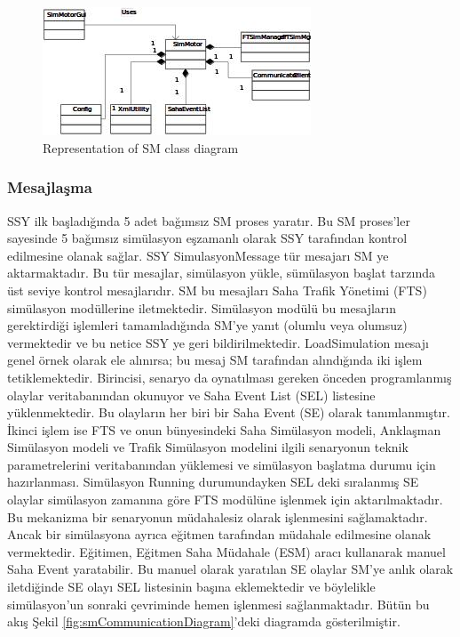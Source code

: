 \documentclass[conference]{IEEEtran}
\begin{document}
\begin{figure}[h!]
  \centering
  \includegraphics[width=8cm]{smgrafic.jpg}
  \caption{Representation of SM class diagram}\label{fig:smgrafic}
\end{figure}



\subsubsection{Mesajlaşma}
SSY ilk başladığında 5 adet bağımsız SM proses yaratır. Bu SM proses’ler sayesinde 5 bağımsız simülasyon eşzamanlı olarak SSY tarafından kontrol edilmesine olanak sağlar. SSY SimulasyonMessage tür mesajarı SM ye aktarmaktadır. Bu tür mesajlar, simülasyon yükle, sümülasyon başlat tarzında üst seviye kontrol mesajlarıdır. SM bu mesajları Saha Trafik Yönetimi (FTS) simülasyon modüllerine iletmektedir. Simülasyon modülü bu mesajların gerektirdiği işlemleri tamamladığında SM’ye yanıt (olumlu veya olumsuz) vermektedir ve bu netice SSY ye geri bildirilmektedir.
LoadSimulation mesajı genel örnek olarak ele alınırsa; bu mesaj SM tarafından alındığında iki işlem tetiklemektedir. Birincisi, senaryo da oynatılması gereken önceden programlanmış olaylar veritabanından okunuyor ve Saha Event List (SEL) listesine yüklenmektedir. Bu olayların her biri bir Saha Event (SE) olarak tanımlanmıştır. 
İkinci işlem ise FTS ve onun bünyesindeki Saha Simülasyon modeli, Anklaşman Simülasyon  modeli ve Trafik Simülasyon  modelini ilgili senaryonun teknik parametrelerini veritabanından yüklemesi ve simülasyon başlatma durumu için hazırlanması.
Simülasyon Running durumundayken SEL deki sıralanmış SE olaylar simülasyon zamanına göre FTS modülüne işlenmek için aktarılmaktadır. Bu mekanizma bir senaryonun müdahalesiz olarak işlenmesini sağlamaktadır. Ancak bir simülasyona ayrıca eğitmen tarafından müdahale edilmesine olanak vermektedir. Eğitimen, Eğitmen Saha Müdahale (ESM) aracı kullanarak manuel Saha Event yaratabilir. Bu manuel olarak yaratılan SE olaylar SM’ye anlık olarak iletdiğinde SE olayı SEL listesinin başına eklemektedir ve böylelikle simülasyon’un sonraki çevriminde hemen işlenmesi sağlanmaktadır. Bütün bu akış Şekil \ref{fig:smCommunicationDiagram}'deki diagramda gösterilmiştir.
\end{document}
